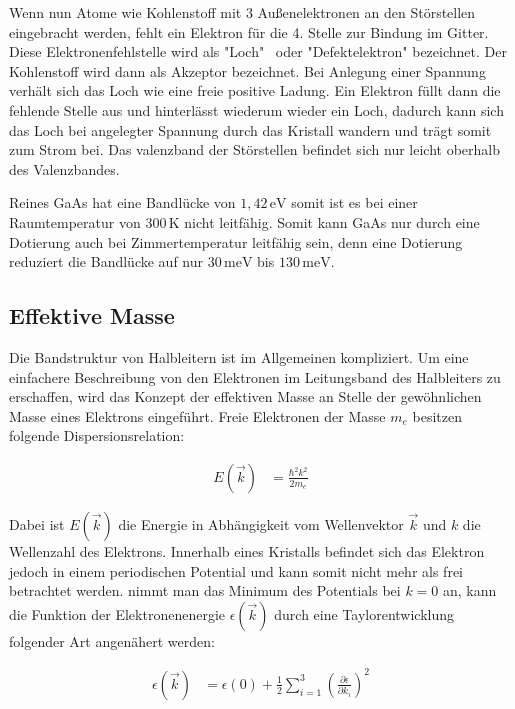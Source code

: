 Wenn nun Atome wie Kohlenstoff mit 3 Außenelektronen an den Störstellen eingebracht werden, fehlt ein Elektron für die 4. Stelle zur Bindung im Gitter. Diese Elektronenfehlstelle wird als "Loch" \, oder "Defektelektron" bezeichnet. Der Kohlenstoff wird dann als Akzeptor bezeichnet. Bei Anlegung einer Spannung verhält sich das Loch wie eine freie positive Ladung. Ein Elektron füllt dann die fehlende Stelle aus und hinterlässt wiederum wieder ein Loch, dadurch kann sich das Loch bei angelegter Spannung durch das Kristall wandern und trägt somit zum Strom bei. Das valenzband der Störstellen befindet sich nur leicht oberhalb des Valenzbandes.

Reines GaAs hat eine Bandlücke von $1, \! 42 \, \mathrm{eV}$ somit ist es bei einer Raumtemperatur von $300 \, \mathrm{K}$ nicht leitfähig. Somit kann GaAs nur durch eine Dotierung auch bei Zimmertemperatur leitfähig sein, denn eine Dotierung reduziert die Bandlücke auf nur $30 \, \mathrm{meV}$ bis $130 \, \mathrm{meV}$.

\subsection{Effektive Masse}
\label{sec:eff_masse}

Die Bandstruktur von Halbleitern ist im Allgemeinen kompliziert. Um eine einfachere Beschreibung von den Elektronen im Leitungsband des Halbleiters zu erschaffen, wird das Konzept der effektiven Masse an Stelle der gewöhnlichen Masse eines Elektrons eingeführt. Freie Elektronen der Masse $m_e$ besitzen folgende Dispersionsrelation:

\begin{align}
    E(\vec{k}) &= \frac{\hbar^2 k^2}{2 m_e}
    \label{eqn:frei}
\end{align}

Dabei ist $E(\vec{k})$ die Energie in Abhängigkeit vom Wellenvektor $\vec{k}$ und $k$ die Wellenzahl des Elektrons. Innerhalb eines Kristalls befindet sich das Elektron jedoch in einem periodischen Potential und kann somit nicht mehr als frei betrachtet werden. nimmt man das Minimum des Potentials bei $k = 0$ an, kann die Funktion der Elektronenenergie $\epsilon (\vec{k})$ durch eine Taylorentwicklung folgender Art angenähert werden:

\begin{align}
    \epsilon (\vec{k}) &= \epsilon (0) + \frac{1}{2} \sum^3_{i=1} \left( \frac{\partial \epsilon}{\partial k_i} \right)^2
    \label{eqn:taylor}
\end{align}

